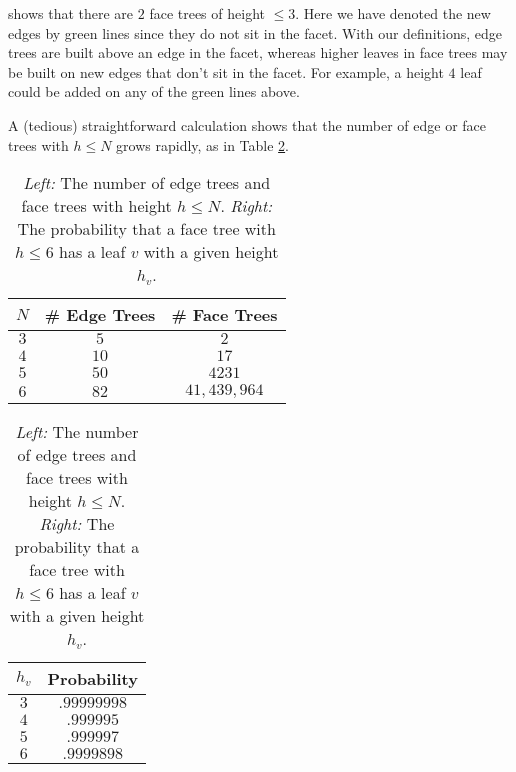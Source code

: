 \documentclass[aps,prl,twocolumn, superscriptaddress,groupedaddress,nofootinbib]{revtex4-1}
\begin{document}
shows that there are $2$ face trees of height $\leq 3$. Here we have denoted the new edges by green lines since they do
not sit in the facet. With our definitions, edge trees are built above an edge
in the facet, whereas higher leaves in face trees may be built on new edges
that don't sit in the facet. For example, a height $4$ leaf could be added
on any of the green lines above.




A (tedious) straightforward calculation shows that the number of
edge or face trees with $h \leq N$ grows rapidly, as in
Table \ref{tab:numedgefacetreeandprob}.%
\begin{table}
\begin{tabular}{|c|c|c|}
\hline
$N$ & \# Edge Trees & \# Face Trees \\ \hline
$3$ & $5$ & $2$\\
$4$ & $10$ & $17$\\
$5$ & $50$ & $4231$ \\
$6$ & $82$ & $41,439,964$\\ \hline
\end{tabular} \hspace{1cm}
\begin{tabular}{|c|c|}
\hline
$h_v$ & Probability \\ \hline
$3$ & $.99999998$ \\
$4$ & $.999995$ \\
$5$ & $.999997$  \\
$6$ & $.9999898$ \\ \hline
\end{tabular}
\caption{\emph{Left:} The number of edge trees and face trees with height $h\leq N$.
\emph{Right:} The probability that a face tree with $h\leq 6$ has a leaf $v$ with
a given height $h_v$.}
\label{tab:numedgefacetreeandprob}
\end{table}

\end{document}
